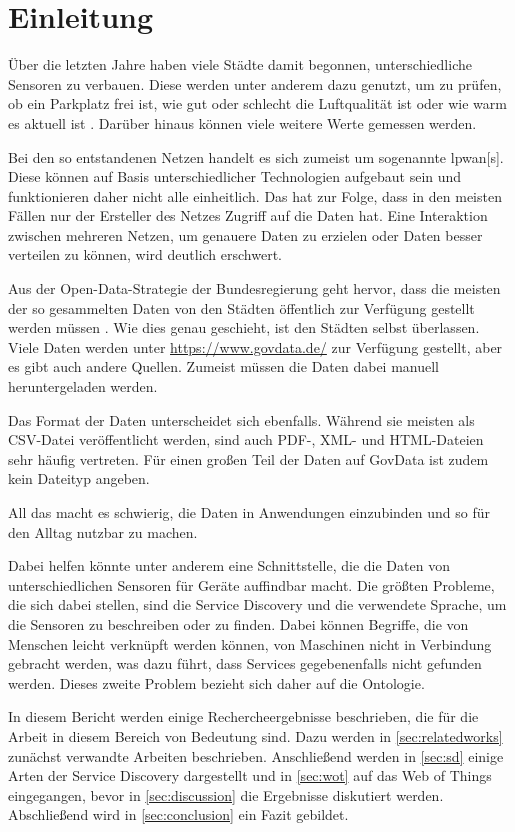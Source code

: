\section{Einleitung}\label{sec:introduction}

Über die letzten Jahre haben viele Städte damit begonnen, unterschiedliche Sensoren zu verbauen.
Diese werden unter anderem dazu genutzt, um zu prüfen, ob ein Parkplatz frei ist, wie gut oder schlecht die Luftqualität ist oder wie warm es aktuell ist \autocite{Chaudhari.2020.LTEACRaDC}.
Darüber hinaus können viele weitere Werte gemessen werden.

Bei den so entstandenen Netzen handelt es sich zumeist um sogenannte \gls{lpwan}[s]. Diese können auf Basis unterschiedlicher Technologien aufgebaut sein und funktionieren daher nicht alle einheitlich. Das hat zur Folge, dass in den meisten Fällen nur der Ersteller des Netzes Zugriff auf die Daten hat. Eine Interaktion zwischen mehreren Netzen, um genauere Daten zu erzielen oder Daten besser verteilen zu können, wird deutlich erschwert.

Aus der Open-Data-Strategie der Bundesregierung geht hervor, dass die meisten der so gesammelten Daten von den Städten öffentlich zur Verfügung gestellt werden müssen \autocite{BMI.}.
Wie dies genau geschieht, ist den Städten selbst überlassen. Viele Daten werden unter \url{https://www.govdata.de/} zur Verfügung gestellt, aber es gibt auch andere Quellen. Zumeist müssen die Daten dabei manuell heruntergeladen werden.

Das Format der Daten unterscheidet sich ebenfalls. Während sie meisten als CSV-Datei veröffentlicht werden, sind auch PDF-, XML- und HTML-Dateien sehr häufig vertreten. Für einen großen Teil der Daten auf GovData ist zudem kein Dateityp angeben.

All das macht es schwierig, die Daten in Anwendungen einzubinden und so für den Alltag nutzbar zu machen.

Dabei helfen könnte unter anderem eine Schnittstelle, die die Daten von unterschiedlichen Sensoren für Geräte auffindbar macht.
Die größten Probleme, die sich dabei stellen, sind die Service Discovery und die verwendete Sprache, um die Sensoren zu beschreiben oder zu finden.
Dabei können Begriffe, die von Menschen leicht verknüpft werden können, von Maschinen nicht in Verbindung gebracht werden, was dazu führt, dass Services gegebenenfalls nicht gefunden werden.
Dieses zweite Problem bezieht sich daher auf die Ontologie.

In diesem Bericht werden einige Rechercheergebnisse beschrieben, die für die Arbeit in diesem Bereich von Bedeutung sind.
Dazu werden in \autoref{sec:relatedworks} zunächst verwandte Arbeiten beschrieben.
Anschließend werden in \autoref{sec:sd} einige Arten der Service Discovery dargestellt und in \autoref{sec:wot} auf das Web of Things eingegangen, bevor in \autoref{sec:discussion} die Ergebnisse diskutiert werden.
Abschließend wird in \autoref{sec:conclusion} ein Fazit gebildet.
